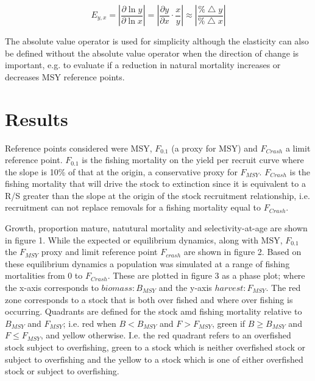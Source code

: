 \documentclass[10pt]{article}
\begin{document}
\begin{equation}
 E_{y,x} = \left| \frac{\partial \ln y}{\partial \ln x} \right|        
     = \left| \frac{\partial  y}{\partial  x} \cdot \frac{x}{y} \right|
       \approx \left| \frac{ \%\bigtriangleup  y}{\%\bigtriangleup x} \right|  
  \end{equation} 

The absolute value operator is used for simplicity although the elasticity can also be defined without the absolute value operator when the direction of 
change is important, e.g. to evaluate if a reduction in natural mortality increases or decreases MSY reference points.	


\section*{Results}

Reference points considered were MSY, $F_{0.1}$ (a proxy for MSY) and $F_{Crash}$ a limit reference point. $F_{0.1}$ is the fishing mortality on the yield per recruit
curve where the slope is 10\%  of that at the origin, a conservative proxy for $F_{MSY}$. $F_{Crash}$ is the fishing mortality that will drive the
stock to extinction since it is equivalent to a R/S greater than the slope at the origin of the stock recruitment relationship, i.e. recruitment can not replace removals
for a fishing mortality equal to $F_{Crash}$.  

Growth, proportion mature, natutural mortality and selectivity-at-age are shown in figure 1. While the expected or equilibrium dynamics, along with 
MSY, $F_{0.1}$ the $F_{MSY}$ proxy and limit reference point $F_{crash}$ are shown in figure 2. Based on these equilibrium dynamics a population was 
simulated at a range of fishing mortalities from 0 to $F_{Crash}$. These are plotted in figure 3 as a phase plot; where the x-axis corresponds to $biomass:B_{MSY}$ and the 
y-axis $harvest:F_{MSY}$. The red zone corresponds to a stock that is both over fished and where over fishing is occurring. Quadrants are defined for the 
stock amd fishing mortality relative to $B_{MSY}$ and $F_{MSY}$; i.e. red when $B<B_{MSY}$ and $F>F_{MSY}$, green if $B≥B_{MSY}$ and $F≤F_{MSY}$,
and yellow otherwise. I.e. the red quadrant refers to an overfished stock subject to overfishing, green to a stock which is neither overfished stock 
or subject to overfishing and the yellow to a stock which is one of either overfished stock or subject to overfishing.
\end{document}
